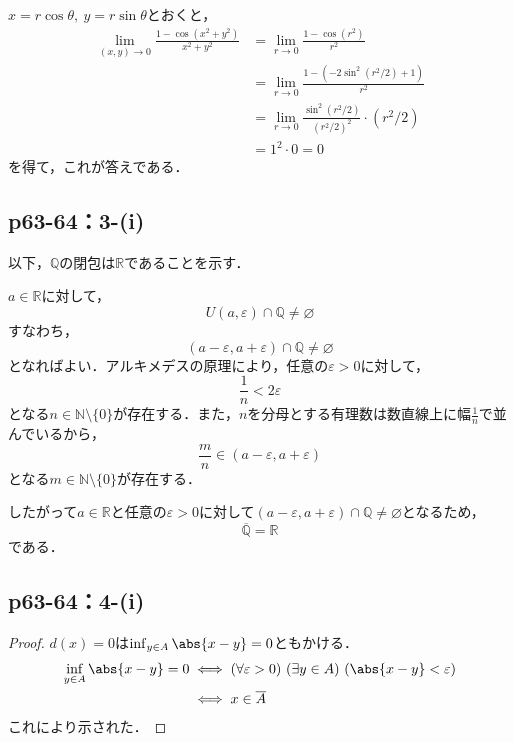 \documentclass[uplatex,dvipdfmx,a4paper,10pt,fleqn]{jsarticle}
\begin{document}
\begin{tleftbar}
    $x=r \cos \theta,~y=r\sin \theta$とおくと，
    \begin{align*}
        \lim_{(x,y)\to 0} \frac{1-\cos (x^2+y^2)}{x^2+y^2} & = \lim_{r \to 0} \frac{1-\cos (r^2)}{r^2} \\
        & =\lim_{r \to 0} \frac{1-(-2\sin ^2 (r^2/2)+1)}{r^2} \\
        & =\lim_{r \to 0} \frac{\sin ^2 (r^2/2)}{(r^2/2)^2} \cdot (r^2/2) \\
        & = 1^2 \cdot 0 =0
    \end{align*}
    を得て，これが答えである．
\end{tleftbar}



\subsection*{p63-64：3-(i)}

\begin{tleftbar}
    以下，$\mathbb{Q}$の閉包は$\mathbb{R}$であることを示す．

    $a \in \mathbb{R}$に対して，
    \[
    U(a,\varepsilon) \cap \mathbb{Q} \ne \varnothing
    \]
    すなわち，
    \[
        (a-\varepsilon,a+\varepsilon) \cap \mathbb{Q} \ne \varnothing
    \]
    となればよい．アルキメデスの原理により，任意の$\varepsilon >0$に対して，
    \[
        \frac{1}{n}< 2\varepsilon 
    \]
    となる$n \in \mathbb{N} \setminus \{0\}$が存在する．また，$n$を分母とする有理数は数直線上に幅$\frac{1}{n}$で並んでいるから，
    \[
        \frac{m}{n} \in (a-\varepsilon,a+\varepsilon)
    \]
    となる$ m \in \mathbb{N} \setminus \{0\}$が存在する．\par 
    したがって$a \in \mathbb{R}$と任意の$\varepsilon>0$に対して$(a-\varepsilon,a+\varepsilon) \cap \mathbb{Q} \ne \varnothing$となるため，
    \[
        \overline{\mathbb{Q}}=\mathbb{R}
    \]
    である．
\end{tleftbar}

\subsection*{p63-64：4-(i)}

\begin{tleftbar}
    \begin{proof}
            $d(x)=0$は$\inf_{y \in A} \abs{x-y} =0$ともかける．
            \begin{align*}
                \inf_{y \in A} \abs{x-y} =0 & \iff (\forall \varepsilon>0) \ (\exists y \in A)\ ( \abs{x-y}<\varepsilon ) \\
                & \iff x \in \overline{A}
            \end{align*}
            これにより示された．
        \end{proof}
    \end{tleftbar}
\end{document}
